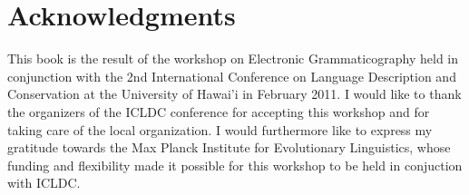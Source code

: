 \renewcommand\chapname{Acknowledgments}	
\renewcommand\longchapname{Acknowledgments}
\renewcommand\shortauthor{}
\renewcommand\longauthor{}
\chapter*{\longchapname}   
\mytoc{}
This book is the result of the workshop on Electronic Grammaticography held in conjunction with the 2nd International Conference on Language Description and Conservation at the University of Hawai'i in February 2011. I would like to thank the organizers of the ICLDC conference for accepting this workshop and for taking care of the local organization. I would furthermore like to express my gratitude towards the Max Planck Institute for Evolutionary Linguistics, whose funding and flexibility made it possible for this workshop to be held in conjuction with ICLDC.